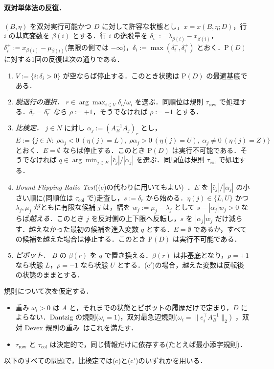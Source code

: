 \documentclass[11pt,a4paper]{ltjsarticle}
\theoremstyle{plain}
\theoremstyle{definition}
\theoremstyle{remark}
\newcommand{\Pb}{\mathrm{P}}
\begin{document}
\paragraph{双対単体法の反復．}
$(B,\eta)$ を双対実行可能かつ $D$ に対して許容な状態とし，$x=x(B,\eta;D)$，行 $i$ の基底変数を $\beta(i)$ とする．行 $i$ の逸脱量を $\delta_i^-:=\lambda_{\beta(i)}-x_{\beta(i)}$，$\delta_i^+:=x_{\beta(i)}-\mu_{\beta(i)}$(無限の側では $-\infty$)，$\delta_i:=\max(\delta_i^-,\delta_i^+)$ とおく．$\Pb(D)$ に対する1回の反復は次の通りである．
\begin{enumerate}[label=(\alph*)]
\item $V:=\{i:\delta_i>0\}$ が空ならば停止する．このとき状態は $\Pb(D)$ の最適基底である．
\item \emph{脱退行の選択．} $r\in\arg\max_{i\in V}\delta_i/\omega_i$ を選ぶ．同順位は規則 $\tau_{\mathrm{row}}$ で処理する．$\delta_r=\delta_r^-$ なら $\rho:=+1$，そうでなければ $\rho:=-1$ とする．
\item \emph{比検定．} $j\in N$ に対し $\alpha_j:=(A_B^{-1}A_j)_r$ とし，
$E:=\{j\in N:\ \rho\alpha_j<0\ (\eta(j)=L),\ \rho\alpha_j>0\ (\eta(j)=U),\ \alpha_j\neq0\ (\eta(j)=Z)\}$
とおく．$E=\emptyset$ ならば停止する．このとき $\Pb(D)$ は実行不可能である．そうでなければ $q\in\arg\min_{j\in E}|\bar c_j|/|\alpha_j|$ を選ぶ．同順位は規則 $\tau_{\mathrm{col}}$ で処理する．
\item[(c$'$)] \emph{Bound Flipping Ratio Test}((c)の代わりに用いてもよい)~\cite{kostina2002,maros2003pl,koberstein2005}．$E$ を $|\bar c_j|/|\alpha_j|$ の小さい順に(同順位は $\tau_{\mathrm{col}}$ で)走査し，$s:=\delta_r$ から始める．$\eta(j)\in\{L,U\}$ かつ $\lambda_j,\mu_j$ がともに有限な候補 $j$ は，幅を $w_j:=\mu_j-\lambda_j$ として $s-|\alpha_j|w_j>0$ ならば\emph{越える}．このとき $j$ を反対側の上下限へ反転し，$s$ を $|\alpha_j|w_j$ だけ減らす．越えなかった最初の候補を進入変数 $q$ とする．$E=\emptyset$ であるか，すべての候補を越えた場合は停止する．このとき $\Pb(D)$ は実行不可能である．
\item \emph{ピボット．} $B$ の $\beta(r)$ を $q$ で置き換える．$\beta(r)$ は非基底となり，$\rho=+1$ なら状態 $L$，$\rho=-1$ なら状態 $U$ とする．(c$'$)の場合，越えた変数は反転後の状態のままとする．
\end{enumerate}
規則について次を仮定する．
\begin{itemize}
\item 重み $\omega_i>0$ は $A$ と，それまでの状態とピボットの履歴だけで定まり，$D$ によらない．Dantzig の規則($\omega_i=1$)，双対最急辺規則($\omega_i=\|e_i^\top A_B^{-1}\|_2$)~\cite{forrestgoldfarb1992}，双対 Devex 規則の重み~\cite{harris1973}はこれを満たす．
\item $\tau_{\mathrm{row}}$ と $\tau_{\mathrm{col}}$ は決定的で，同じ情報だけに依存する(たとえば最小添字規則)．
\end{itemize}
以下のすべての問題で，比検定では(c)と(c$'$)のいずれかを用いる．
\end{document}
